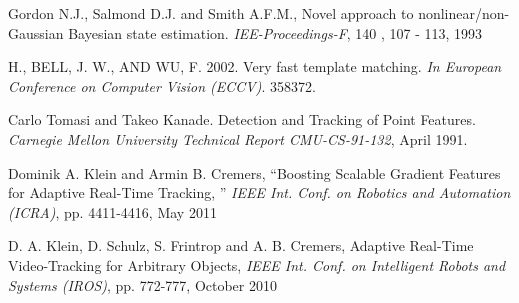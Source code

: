 \begin{thebibliography}{SMAT}
 Gordon N.J., Salmond D.J. and Smith A.F.M., Novel approach to nonlinear/non-Gaussian Bayesian state estimation. \textit{IEE-Proceedings-F}, 140 , 107 - 113, 1993

 H., BELL, J. W., AND WU, F. 2002. Very fast template matching. \textit{In European Conference on Computer Vision (ECCV)}. 358\textendash{}372.

Carlo Tomasi and Takeo Kanade. Detection and Tracking of Point Features. \textit{Carnegie Mellon University Technical Report CMU-CS-91-132}, April 1991.

 Dominik A. Klein and Armin B. Cremers, \textquotedblleft{}Boosting Scalable Gradient Features for Adaptive Real-Time Tracking, \textquotedblright{} \textit{IEEE Int. Conf. on Robotics and Automation (ICRA)}, pp. 4411-4416, May 2011

 D. A. Klein, D. Schulz, S. Frintrop and A. B. Cremers, Adaptive Real-Time Video-Tracking for Arbitrary Objects, \textit{IEEE Int. Conf. on Intelligent Robots and Systems (IROS)}, pp. 772-777, October 2010

\end{thebibliography}